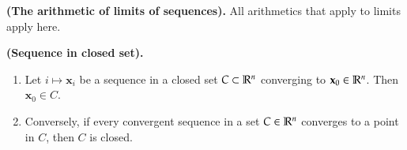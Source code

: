 \begin{theorem}
\textbf{(The arithmetic of limits of sequences). } All arithmetics that apply to limits apply here.
\end{theorem}

\begin{proposition}
\textbf{(Sequence in closed set).}
\begin{enumerate}
  \item Let $i\mapsto \bm{x}_i$ be a sequence in a closed set $C \subset \mathbb{R}^n$ converging to $\textbf{x}_0\in \mathbb{R}^n$. Then $\bm{x}_0\in C$.
  \item Conversely, if every convergent sequence in a set $C \in \mathbb{R}^n$ converges to a point in $C$, then $C$ is closed. 
\end{enumerate}
\end{proposition}
